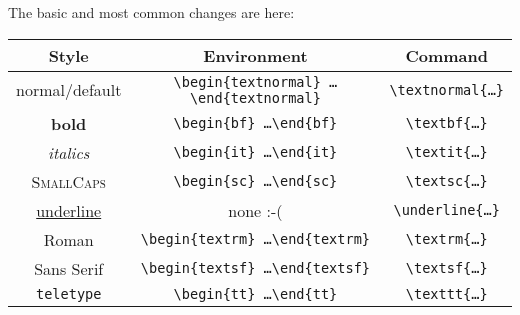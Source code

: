 The basic and most common changes are here:
\begin{small}
  \begin{center}
    \begin{tabular}{c c c}
      \hline
      Style               & Environment                                                                          & Command \\
      \hline
      normal/default      & \texttt{\textbackslash begin\{textnormal\} \ldots \textbackslash end\{textnormal\}}  & \texttt{\textbackslash textnormal\{\ldots \}}\\
      \textbf{bold}        & \texttt{\textbackslash begin\{bf\} \ldots \textbackslash end\{bf\}}  & \texttt{\textbackslash textbf\{\ldots \}}\\
      \textit{italics}     & \texttt{\textbackslash begin\{it\} \ldots \textbackslash end\{it\}}  & \texttt{\textbackslash textit\{\ldots \}}\\
      \textsc{SmallCaps}   & \texttt{\textbackslash begin\{sc\} \ldots \textbackslash end\{sc\}}  & \texttt{\textbackslash textsc\{\ldots \}}\\
      \underline{underline}&                                none  :-(                             & \texttt{\textbackslash underline\{\ldots \}}\\
      \textrm{Roman}       & \texttt{\textbackslash begin\{textrm\} \ldots \textbackslash end\{textrm\}}  & \texttt{\textbackslash textrm\{\ldots \}}\\
      \textsf{Sans Serif}  & \texttt{\textbackslash begin\{textsf\} \ldots \textbackslash end\{textsf\}}  & \texttt{\textbackslash textsf\{\ldots \}}\\
      \texttt{teletype}    & \texttt{\textbackslash begin\{tt\} \ldots \textbackslash end\{tt\}}  & \texttt{\textbackslash texttt\{\ldots \}}\\
      \hline
    \end{tabular}
  \end{center}
\end{small}

